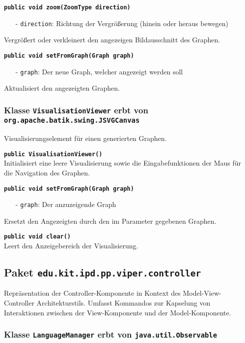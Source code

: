 \documentclass[parskip=full,11pt,twoside]{scrartcl}
\begin{document}
\textbf{\texttt{public void zoom(ZoomType direction)}}
\begin{itemize}[noitemsep]
	\item[-] \texttt{direction}: Richtung der Vergrößerung (hinein oder heraus bewegen)
\end{itemize}
Vergrößert oder verkleinert den angezeigen Bildausschnitt des Graphen.

\textbf{\texttt{public void setFromGraph(Graph graph)}}
\begin{itemize}[noitemsep]
	\item[-] \texttt{graph}: Der neue Graph, welcher angezeigt werden soll
\end{itemize}
Aktualisiert den angezeigten Graphen.

\subsubsection{Klasse \texttt{VisualisationViewer} erbt von \texttt{org.apache.batik.swing.JSVGCanvas}}

Visualisierungselement für einen generierten Graphen.

\textbf{\texttt{public VisualisationViewer()}}\\
Initialisiert eine leere Visualisierung sowie die Eingabefunktionen der Maus für die Navigation des Graphen.

\textbf{\texttt{public void setFromGraph(Graph graph)}}
\begin{itemize}[noitemsep]
	\item[-] \texttt{graph}: Der anzuzeigende Graph
\end{itemize}
Ersetzt den Angezeigten durch den im Parameter gegebenen Graphen.

\textbf{\texttt{public void clear()}}\\
Leert den Anzeigebereich der Visualisierung.

\newpage
\subsection{Paket \texttt{edu.kit.ipd.pp.viper.controller}}

Repräsentation der Controller-Komponente in Kontext des Model-View-Controller Architekturstils. Umfasst Kommandos zur Kapselung von Interaktionen zwischen der View-Komponente und der Model-Komponente.

\subsubsection{Klasse \texttt{LanguageManager} erbt von \texttt{java.util.Observable}}
\end{document}
